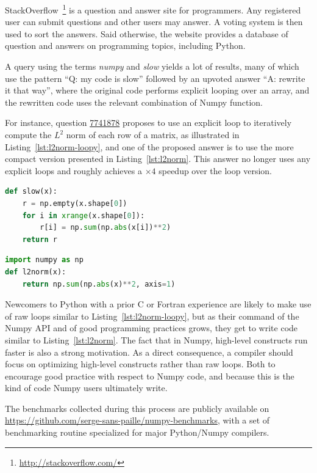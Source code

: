 \documentclass[10pt, preprint]{sigplanconf}
\begin{document}
StackOverflow~\footnote{\url{http://stackoverflow.com/}} is a question and
answer site for programmers. Any registered user can submit questions and other
users may answer. A voting system is then used to sort the answers. Said
otherwise, the website provides a database of question and answers on
programming topics, including Python.

A query using the terms \emph{numpy} and \emph{slow} yields a lot of results, many
of which use the pattern ``Q: my code is slow'' followed by an upvoted answer
``A: rewrite it that way'', where the original code performs explicit looping
over an array, and the rewritten code uses the relevant combination of Numpy
function.

For instance, question \href{http://stackoverflow.com/questions/7741878}{7741878}
proposes to use an explicit loop to iteratively compute the $L^2$ norm of each
row of a matrix, as illustrated in Listing~\ref{lst:l2norm-loopy}, and one of
the proposed answer is to use the more compact version presented in
Listing~\ref{lst:l2norm}. This answer no longer uses any explicit loops and
roughly achieves a $\times 4$ speedup over the loop version.

\begin{lstlisting}[language=python,caption={Per row version of $L^2$ norm with loop in Numpy.}, label={lst:l2norm-loopy}]
def slow(x):
    r = np.empty(x.shape[0])
    for i in xrange(x.shape[0]):
        r[i] = np.sum(np.abs(x[i])**2)
    return r
\end{lstlisting}

\begin{lstlisting}[language=python,caption={Per row version of $L^2$ norm without loop in Numpy.}, label={lst:l2norm}]
import numpy as np
def l2norm(x):
    return np.sum(np.abs(x)**2, axis=1)
\end{lstlisting}

Newcomers to Python with a prior C or Fortran experience are likely to make
use of raw loops similar to Listing~\ref{lst:l2norm-loopy}, but as their
command of the Numpy API and of good programming practices grows, they get to write code similar
to Listing~\ref{lst:l2norm}. The fact that in Numpy, high-level constructs run faster is also a
strong motivation. As a direct consequence, a compiler should focus on optimizing
high-level constructs rather than raw
loops. Both to encourage good practice with respect to Numpy code, and because
this is the kind of code Numpy users ultimately write.

The benchmarks collected during this process are publicly available on
\url{https://github.com/serge-sans-paille/numpy-benchmarks}, with a set of
benchmarking routine specialized for major Python/Numpy compilers.
\end{document}
